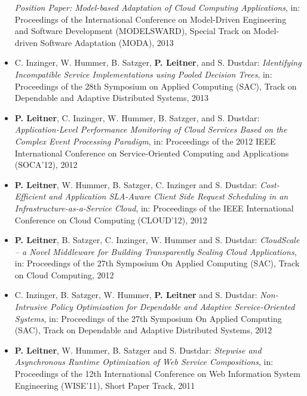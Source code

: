\documentclass[paper=letter,fontsize=11pt]{scrartcl} %
\begin{document}
\begin{itemize}
\emph{Position Paper: Model-based Adaptation of Cloud Computing Applications},  in: Proceedings of the International Conference on Model-Driven Engineering and Software Development (MODELSWARD), Special Track on Model-driven Software Adaptation (MODA), 2013
\item C. Inzinger, W. Hummer, B. Satzger, \textbf{P. Leitner}, and S. Dustdar:
\emph{Identifying Incompatible Service Implementations using Pooled Decision Trees},  in: Proceedings of the 28th Symposium on Applied Computing (SAC), Track on Dependable and Adaptive Distributed Systems, 2013
\item \textbf{P. Leitner}, C. Inzinger, W. Hummer, B. Satzger, and S. Dustdar:
\emph{Application-Level Performance Monitoring of Cloud Services Based on the Complex Event Processing Paradigm}, in: Proceedings of the 2012 IEEE International Conference on Service-Oriented Computing and Applications (SOCA'12), 2012
\item \textbf{P. Leitner}, W. Hummer, B. Satzger, C. Inzinger and S. Dustdar:
\emph{Cost-Efficient and Application SLA-Aware Client Side Request Scheduling in an Infrastructure-as-a-Service Cloud}, in: Proceedings of the IEEE International Conference on Cloud Computing (CLOUD'12), 2012
\item \textbf{P. Leitner}, B. Satzger, C. Inzinger, W. Hummer and S. Dustdar:
\emph{CloudScale -- a Novel Middleware for Building Transparently Scaling
Cloud Applications}, in: Proceedings of the 27th Symposium On Applied Computing (SAC),
Track on Cloud Computing, 2012
\item C. Inzinger, B. Satzger, W. Hummer, \textbf{P. Leitner} and S. Dustdar:
\emph{Non-Intrusive Policy Optimization for Dependable and Adaptive Service-Oriented Systems}, in: Proceedings of the 27th Symposium On Applied Computing (SAC),
Track on Dependable and Adaptive Distributed Systems, 2012
\item \textbf{P. Leitner}, W. Hummer, B. Satzger and S. Dustdar:
\emph{Stepwise and Asynchronous Runtime Optimization of Web Service
Compositions}, in: Proceedings of the 12th International Conference on Web
Information System Engineering (WISE'11), Short Paper Track, 2011

\end{itemize}
\end{document}
